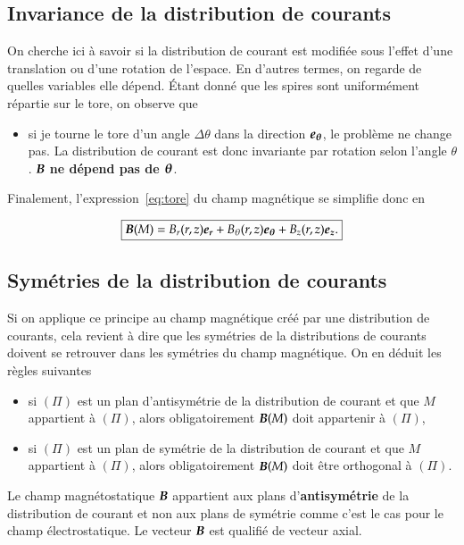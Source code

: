 \subsection{Invariance de la distribution de courants}
On cherche ici à savoir si la distribution de courant est modifiée sous l'effet
d'une translation ou d'une rotation de l'espace. En d'autres termes, on regarde
de quelles variables elle dépend. Étant donné que les spires sont uniformément
répartie sur le tore, on observe que

\begin{itemize}
	\item  si je tourne le tore d'un angle $\Delta \theta$ dans la
	  direction $\etheta$, le problème
	  ne change pas. La distribution de courant est donc invariante 
	  par rotation selon l'angle $\theta$. $\vecb$ \textbf{ne dépend pas de
	  $\mitbf{\theta}$}.
\end{itemize}

Finalement, l'expression~\ref{eq:tore} du champ magnétique se simplifie donc en 

\begin{equation*}
	\boxed{\vecb(M) = B_r(r,z)\er + B_\theta(r,z)\etheta + B_z(r,z)\ez.}
\end{equation*}
\subsection{Symétries de la distribution de courants}

Si on applique ce principe au champ magnétique créé par une distribution 
de courants, cela revient à dire que les symétries de la distributions de 
courants doivent se retrouver dans les symétries du champ magnétique. On en 
déduit les règles suivantes

\begin{defn}
\begin{itemize}
  \item si $(\Pi)$ est un plan d'antisymétrie de la distribution de courant et que 
    $M$ appartient à $(\Pi)$, alors obligatoirement $\vecb(M)$ doit 
    appartenir à $(\Pi)$,
  \item si $(\Pi)$ est un plan de symétrie de la distribution de courant 
    et que $M$ appartient à $(\Pi)$, alors obligatoirement $\vecb(M)$ doit 
    être orthogonal à $(\Pi)$.
\end{itemize}
\end{defn}

\begin{rema}
	Le champ magnétostatique $\vecb$ appartient aux plans d'\textbf{antisymétrie}
	de la distribution de courant et non aux plans de symétrie comme
	c'est le cas pour le champ électrostatique. Le vecteur $\vecb$ est 
	qualifié de vecteur axial.
\end{rema}

